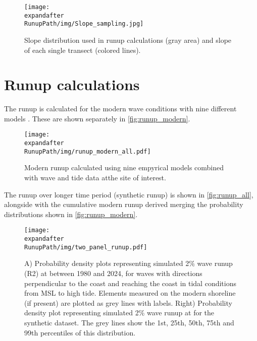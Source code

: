 \documentclass[a4paper, 11pt]{article}
\begin{document}
\begin{figure}[ht]
    \centering
	\texttt{[image: \\expandafter\\RunupPath/img/Slope\_sampling.jpg]}
    \caption{Slope distribution used in runup calculations (gray area) and slope of each single transect (colored lines).}
	\label{fig:slope_image}
\end{figure}

\pagebreak
\section*{Runup calculations}
The runup is calculated for the modern wave conditions with nine different models \citep{STOCKDON2006573,vousdoukas2012coastal,HOLMAN1986527,POWER201947,passarella2018use,senechal2011wave,ATKINSON201715,ruggiero2001wave,nielsen2009coastal}. These are shown separately in \autoref{fig:runup_modern}.

\begin{figure}[ht]
    \centering
	\texttt{[image: \\expandafter\\RunupPath/img/runup\_modern\_all.pdf]}
    \caption{Modern runup calculated using nine empyrical models combined with wave and tide data atthe site of interest.}
	\label{fig:runup_modern}
\end{figure}

\pagebreak
The runup over longer time period (synthetic runup) is shown in \autoref{fig:runup_all}, alongside with the cumulative modern runup derived merging the probability distributions shown in \autoref{fig:runup_modern}.

\begin{figure}[ht]
    \centering
	\texttt{[image: \\expandafter\\RunupPath/img/two\_panel\_runup.pdf]}
    \caption{A) Probability density plots representing simulated 2\% wave runup (R2) at \sitename  between 1980 and 2024, for waves with directions perpendicular to the coast and reaching the coast in tidal conditions from MSL to high tide. Elements measured on the modern shoreline (if present) are plotted as grey lines with labels. Right) Probability density plot representing simulated 2\% wave runup at \sitename  for the synthetic dataset. The grey lines show the 1st, 25th, 50th, 75th and 99th percentiles of this distribution.}
	\label{fig:runup_all}
\end{figure}

\pagebreak


\end{document}
